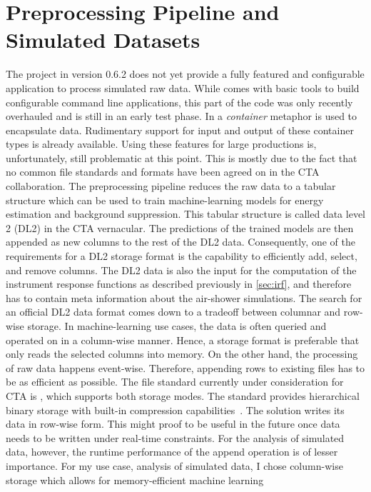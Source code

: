 \section{Preprocessing Pipeline and Simulated Datasets}
\label{sec:pipeline}
The \ctapipe project in version 0.6.2 does not yet provide a fully featured and configurable application 
to process simulated raw data. 
While \ctapipe comes with basic tools to build configurable command line applications, this part of the code was only recently overhauled 
and is still in an early test phase. In \ctapipe a \emph{container} metaphor is used to encapsulate data. 
Rudimentary support for input and output of these container types is already available.
Using these features for large productions is, unfortunately, still problematic at this point. 
This is mostly due to the fact that no common file standards and formats have been agreed on in the CTA collaboration. 
The \ctapipe preprocessing pipeline reduces the raw data to a tabular structure which can be used to train 
machine-learning models for energy estimation and background suppression.
This tabular structure is called data level 2 (DL2) in the CTA vernacular.
The predictions of the trained models are then appended as new columns to the rest of the DL2 data.
Consequently, one of the requirements for a DL2 storage format is the capability to efficiently add, select, and remove columns. 
The DL2 data is also the input for the computation of the instrument response functions as described previously in \cref{sec:irf}, and therefore 
has to contain meta information about the air-shower simulations. 
The search for an official DL2 data format comes down to a tradeoff between columnar and row-wise storage.
In machine-learning use cases, the data is often queried and operated on in a column-wise manner.
Hence, a storage format is preferable that only reads the selected columns into memory. 
On the other hand, the processing of raw data happens event-wise. Therefore, appending rows to existing files has to be as efficient as possible.
The file standard currently under consideration for CTA is \hdf, which supports both storage modes. 
The \hdf standard provides hierarchical binary storage with built-in compression capabilities~\cite{hdf5}. 
The \ctapipe solution writes its data in row-wise form. This might proof to be useful in the future once data 
needs to be written under real-time constraints. 
For the analysis of simulated data, however, the runtime performance of the append operation is of lesser importance. 
For my use case, analysis of simulated data, I chose column-wise storage which allows for memory-efficient machine learning 
